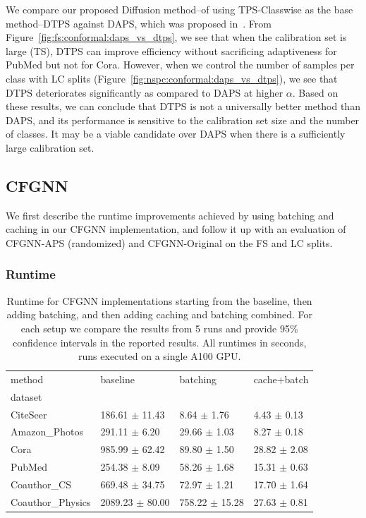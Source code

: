 We compare our proposed Diffusion method--of using TPS-Classwise as the base method--DTPS against DAPS, which was proposed in~\cite{zargarbashi23conformal}.
From Figure~\ref{fig:fs:conformal:daps_vs_dtps}, we see that when the calibration set is large (TS), DTPS can improve efficiency without sacrificing adaptiveness for PubMed but not for Cora.
However, when we control the number of samples per class with LC splits (Figure~\ref{fig:nspc:conformal:daps_vs_dtps}), we see that DTPS deteriorates significantly as compared to DAPS at higher $\alpha$.
Based on these results, we can conclude that DTPS is not a universally better method than DAPS, and its performance is sensitive to the calibration set size and the number of classes.
It may be a viable candidate over DAPS when there is a sufficiently large calibration set.

\subsection{CFGNN}
We first describe the runtime improvements achieved by using batching and caching in our CFGNN implementation, and follow it up with an evaluation of CFGNN-APS (randomized) and CFGNN-Original on the FS and LC splits.
\subsubsection{Runtime}
\label{sec:conformal:results:cfgnn:runtime}

\begin{table}[h]
    \centering
    \begin{tabular}{llll}
        \toprule
        method & baseline & batching & cache+batch \\
        dataset &  &  &  \\
        \midrule
        CiteSeer & 186.61 $\pm$ 11.43 & 8.64 $\pm$ 1.76 & 4.43 $\pm$ 0.13 \\
        Amazon\_Photos & 291.11 $\pm$ 6.20 & 29.66 $\pm$ 1.03 & 8.27 $\pm$ 0.18 \\
        Cora & 985.99 $\pm$ 62.42 & 89.80 $\pm$ 1.50 & 28.82 $\pm$ 2.08 \\
        PubMed & 254.38 $\pm$ 8.09 & 58.26 $\pm$ 1.68 & 15.31 $\pm$ 0.63 \\
        Coauthor\_CS & 669.48 $\pm$ 34.75 & 72.97 $\pm$ 1.21 & 17.70 $\pm$ 1.64 \\
        Coauthor\_Physics & 2089.23 $\pm$ 80.00 & 758.22 $\pm$ 15.28 & 27.63 $\pm$ 0.81 \\
        \bottomrule
    \end{tabular}
    \caption{Runtime for CFGNN implementations starting from the baseline, then adding batching, and then adding caching and batching combined. For each setup we compare the results from 5 runs and provide 95\% confidence intervals in the reported results. All runtimes in seconds, runs executed on a single A100 GPU.}
    \label{tab:conformal:cfgnn_runtime}
\end{table}

